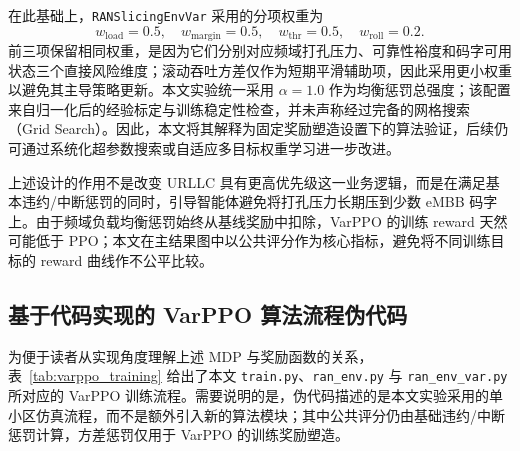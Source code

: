在此基础上，\texttt{RANSlicingEnvVar} 采用的分项权重为
\begin{equation}
w_{\text{load}}=0.5,\quad
w_{\text{margin}}=0.5,\quad
w_{\text{thr}}=0.5,\quad
w_{\text{roll}}=0.2.
\label{eq:varppo_reward_weights}
\end{equation}
前三项保留相同权重，是因为它们分别对应频域打孔压力、可靠性裕度和码字可用状态三个直接风险维度；滚动吞吐方差仅作为短期平滑辅助项，因此采用更小权重以避免其主导策略更新。本文实验统一采用 \(\alpha=1.0\) 作为均衡惩罚总强度；该配置来自归一化后的经验标定与训练稳定性检查，并未声称经过完备的网格搜索（Grid Search）。因此，本文将其解释为固定奖励塑造设置下的算法验证，后续仍可通过系统化超参数搜索或自适应多目标权重学习进一步改进。

上述设计的作用不是改变 URLLC 具有更高优先级这一业务逻辑，而是在满足基本违约/中断惩罚的同时，引导智能体避免将打孔压力长期压到少数 eMBB 码字上。由于频域负载均衡惩罚始终从基线奖励中扣除，VarPPO 的训练 reward 天然可能低于 PPO；本文在主结果图中以公共评分作为核心指标，避免将不同训练目标的 reward 曲线作不公平比较。

\subsection{基于代码实现的 VarPPO 算法流程伪代码}
\label{334-ux57faux4e8eux4ee3ux7801ux5b9eux73b0ux7684-varppo-ux7b97ux6cd5ux6d41ux7a0bux4f2aux4ee3ux7801}

为便于读者从实现角度理解上述 MDP 与奖励函数的关系，表~\ref{tab:varppo_training} 给出了本文 \texttt{train.py}、\texttt{ran\_env.py} 与 \texttt{ran\_env\_var.py} 所对应的 VarPPO 训练流程。需要说明的是，伪代码描述的是本文实验采用的单小区仿真流程，而不是额外引入新的算法模块；其中公共评分仍由基础违约/中断惩罚计算，方差惩罚仅用于 VarPPO 的训练奖励塑造。

